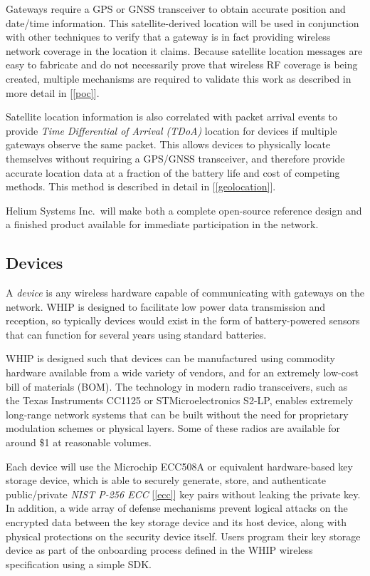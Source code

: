\documentclass[letterpaper,11pt]{article}
\begin{document}
Gateways require a GPS or GNSS transceiver to obtain accurate position and date/time information. This satellite-derived location will be used in conjunction with other techniques to verify that a gateway is in fact providing wireless network coverage in the location it claims. Because satellite location messages are easy to fabricate and do not necessarily prove that wireless RF coverage is being created, multiple mechanisms are required to validate this work as described in more detail in [\ref{poc}].

Satellite location information is also correlated with packet arrival events to provide \emph{Time Differential of Arrival (TDoA)} location for devices if multiple gateways observe the same packet. This allows devices to physically locate themselves without requiring a GPS/GNSS transceiver, and therefore provide accurate location data at a fraction of the battery life and cost of competing methods. This method is described in detail in [\ref{geolocation}].

Helium Systems Inc.\ will make both a complete open-source reference design and a finished product available for immediate participation in the network.

\subsection{Devices}\label{devices}

A \emph{device} is any wireless hardware capable of communicating with gateways on the network. WHIP is designed to facilitate low power data transmission and reception, so typically devices would exist in the form of battery-powered sensors that can function for several years using standard batteries.

WHIP is designed such that devices can be manufactured using commodity hardware available from a wide variety of vendors, and for an extremely low-cost bill of materials (BOM). The technology in modern radio transceivers, such as the Texas Instruments CC1125 or STMicroelectronics S2-LP, enables extremely long-range network systems that can be built without the need for proprietary modulation schemes or physical layers. Some of these radios are available for around \$1 at reasonable volumes.

Each device will use the Microchip ECC508A\cite{ecc} or equivalent hardware-based key storage device, which is able to securely generate, store, and authenticate public/private \emph{NIST P-256 ECC} [\ref{ecc}] key pairs without leaking the private key. In addition, a wide array of defense mechanisms prevent logical attacks on the encrypted data between the key storage device and its host device, along with physical protections on the security device itself. Users program their key storage device as part of the onboarding process defined in the WHIP wireless specification using a simple SDK\@.
\end{document}
